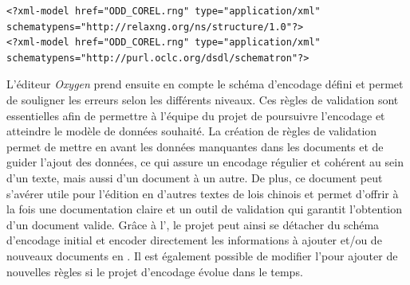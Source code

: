 \begin{verbatim}
<?xml-model href="ODD_COREL.rng" type="application/xml" 
schematypens="http://relaxng.org/ns/structure/1.0"?>
<?xml-model href="ODD_COREL.rng" type="application/xml" 
schematypens="http://purl.oclc.org/dsdl/schematron"?>
\end{verbatim}

L'éditeur \textit{Oxygen} prend ensuite en compte le schéma d'encodage défini et permet de souligner les erreurs selon les différents niveaux. Ces règles de validation sont essentielles afin de permettre à l'équipe du projet de poursuivre l'encodage et atteindre le modèle de données souhaité. La création de règles de validation permet de mettre en avant les données manquantes dans les documents et de guider l'ajout des données, ce qui assure un encodage régulier et cohérent au sein d'un texte, mais aussi d'un document à un autre. De plus, ce document peut s'avérer utile pour l'édition en \TEI d'autres textes de lois chinois et permet d'offrir à la fois une documentation claire et un outil de validation qui garantit l'obtention d'un document valide. Grâce à l'\ODD, le projet \COREL peut ainsi se détacher du schéma d'encodage \LSC initial et encoder directement les informations à ajouter et/ou de nouveaux documents en \TEI. Il est également possible de modifier l'\ODD pour ajouter de nouvelles règles si le projet d'encodage évolue dans le temps. 
